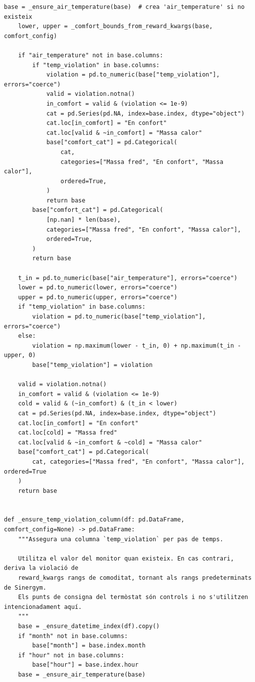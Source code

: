 \documentclass[10pt,a4paper]{article}
\begin{document}
\begin{lstlisting}[style=studioPython,caption={backend/grafics/comfort.py},label={lst:backend-grafics-comfort-py}]
    base = _ensure_air_temperature(base)  # crea 'air_temperature' si no existeix
    lower, upper = _comfort_bounds_from_reward_kwargs(base, comfort_config)

    if "air_temperature" not in base.columns:
        if "temp_violation" in base.columns:
            violation = pd.to_numeric(base["temp_violation"], errors="coerce")
            valid = violation.notna()
            in_comfort = valid & (violation <= 1e-9)
            cat = pd.Series(pd.NA, index=base.index, dtype="object")
            cat.loc[in_comfort] = "En confort"
            cat.loc[valid & ~in_comfort] = "Massa calor"
            base["comfort_cat"] = pd.Categorical(
                cat,
                categories=["Massa fred", "En confort", "Massa calor"],
                ordered=True,
            )
            return base
        base["comfort_cat"] = pd.Categorical(
            [np.nan] * len(base),
            categories=["Massa fred", "En confort", "Massa calor"],
            ordered=True,
        )
        return base

    t_in = pd.to_numeric(base["air_temperature"], errors="coerce")
    lower = pd.to_numeric(lower, errors="coerce")
    upper = pd.to_numeric(upper, errors="coerce")
    if "temp_violation" in base.columns:
        violation = pd.to_numeric(base["temp_violation"], errors="coerce")
    else:
        violation = np.maximum(lower - t_in, 0) + np.maximum(t_in - upper, 0)
        base["temp_violation"] = violation

    valid = violation.notna()
    in_comfort = valid & (violation <= 1e-9)
    cold = valid & (~in_comfort) & (t_in < lower)
    cat = pd.Series(pd.NA, index=base.index, dtype="object")
    cat.loc[in_comfort] = "En confort"
    cat.loc[cold] = "Massa fred"
    cat.loc[valid & ~in_comfort & ~cold] = "Massa calor"
    base["comfort_cat"] = pd.Categorical(
        cat, categories=["Massa fred", "En confort", "Massa calor"], ordered=True
    )
    return base


def _ensure_temp_violation_column(df: pd.DataFrame, comfort_config=None) -> pd.DataFrame:
    """Assegura una columna `temp_violation` per pas de temps.

    Utilitza el valor del monitor quan existeix. En cas contrari, deriva la violació de
    reward_kwargs rangs de comoditat, tornant als rangs predeterminats de Sinergym.
    Els punts de consigna del termòstat són controls i no s'utilitzen intencionadament aquí.
    """
    base = _ensure_datetime_index(df).copy()
    if "month" not in base.columns:
        base["month"] = base.index.month
    if "hour" not in base.columns:
        base["hour"] = base.index.hour
    base = _ensure_air_temperature(base)


\end{lstlisting}
\end{document}
